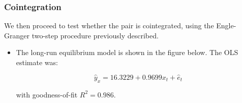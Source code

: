 \documentclass{article}
\begin{document}
    \subsubsection{Cointegration}\label{cointegration}

We then proceed to test whether the pair is cointegrated, using the
Engle-Granger two-step procedure previously described.

\begin{itemize}
\item
  The long-run equilibrium model is shown in the figure below. The OLS
  estimate was:

  \[
   \hat{y}_x = 16.3229 + 0.9699 x_t + \hat{e}_t
  \]

  with goodness-of-fit \(R^2=0.986\).
\end{itemize}
\end{document}
